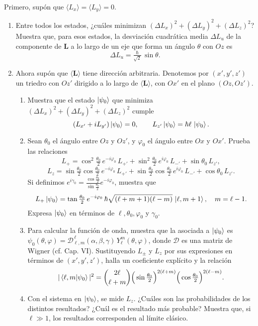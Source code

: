 \documentclass[a4paper,11pt]{article}
\begin{document}
Primero, supón que $\langle L_x\rangle=\langle L_y\rangle=0$.
\begin{enumerate}
	\item Entre todos los estados, ¿cuáles minimizan $(\Delta L_x)^2+(\Delta L_y)^2+(\Delta L_z)^2$? Muestra que, para esos estados, la desviación cuadrática media $\Delta L_u$ de la componente de $\mathbf{L}$ a lo largo de un eje que forma un ángulo $\theta$ con $Oz$ es
	\[
	\Delta L_u=\tfrac{\hbar}{\sqrt{2}}\,\sin\theta.
	\]
	\item Ahora supón que $\langle\mathbf{L}\rangle$ tiene dirección arbitraria. Denotemos por $(x',y',z')$ un triedro con $Oz'$ dirigido a lo largo de $\langle\mathbf{L}\rangle$, con $Ox'$ en el plano $(Oz,Oz')$.
	\begin{enumerate}
		\item Muestra que el estado $\ket{\psi_0}$ que minimiza $(\Delta L_x)^2+(\Delta L_y)^2+(\Delta L_z)^2$ cumple
		\[
		(L_{x'}+iL_{y'})\ket{\psi_0}=0,\qquad L_{z'}\ket{\psi_0}=\hbar\ell\,\ket{\psi_0}.
		\]
		\item Sean $\theta_0$ el ángulo entre $Oz$ y $Oz'$, y $\varphi_0$ el ángulo entre $Ox$ y $Ox'$. Prueba las relaciones
		\[
		L_+=\cos^2\tfrac{\theta_0}{2}\,e^{-i\varphi_0}\,L_{+'}+\sin^2\tfrac{\theta_0}{2}\,e^{i\varphi_0}\,L_{-'}+\sin\theta_0\,L_{z'},
		\]
		\[
		L_z=\sin\tfrac{\theta_0}{2}\cos\tfrac{\theta_0}{2}\,e^{-i\varphi_0}\,L_{+'}+\sin\tfrac{\theta_0}{2}\cos\tfrac{\theta_0}{2}\,e^{i\varphi_0}\,L_{-'}+\cos\theta_0\,L_{z'}.
		\]
		Si definimos $\displaystyle e^{i\gamma_0}=\frac{\cos\tfrac{\theta_0}{2}}{\sin\tfrac{\theta_0}{2}}e^{-i\varphi_0}$, muestra que
		\[
		L_+\ket{\psi_0}=\tan\tfrac{\theta_0}{2}\,e^{-i\varphi_0}\,\hbar\sqrt{(\ell+m+1)(\ell-m)}\,\ket{\ell,m+1},\quad m=\ell-1.
		\]
		Expresa $\ket{\psi_0}$ en términos de $\ell,\theta_0,\varphi_0$ y $\gamma_0$.
		\item Para calcular la función de onda, muestra que la asociada a $\ket{\psi_0}$ es $\psi_0(\theta,\varphi)=\mathcal{D}^{\,\ell}_{\ell,m}(\alpha,\beta,\gamma)\,Y_\ell^m(\theta,\varphi)$, donde $\mathcal{D}$ es una matriz de Wigner (cf. Cap. VI). Sustituyendo $L_\pm$ y $L_z$ por sus expresiones en términos de $(x',y',z')$, halla un coeficiente explícito y la relación
		\[
		|\braket{\ell,m|\psi_0}|^2=\binom{2\ell}{\ell+m}\Big(\sin\tfrac{\theta_0}{2}\Big)^{2(\ell+m)}\Big(\cos\tfrac{\theta_0}{2}\Big)^{2(\ell-m)}.
		\]
		\item Con el sistema en $\ket{\psi_0}$, se mide $L_z$. ¿Cuáles son las probabilidades de los distintos resultados? ¿Cuál es el resultado más probable? Muestra que, si $\ell\gg 1$, los resultados corresponden al límite clásico.
	\end{enumerate}
\end{enumerate}
\end{document}
